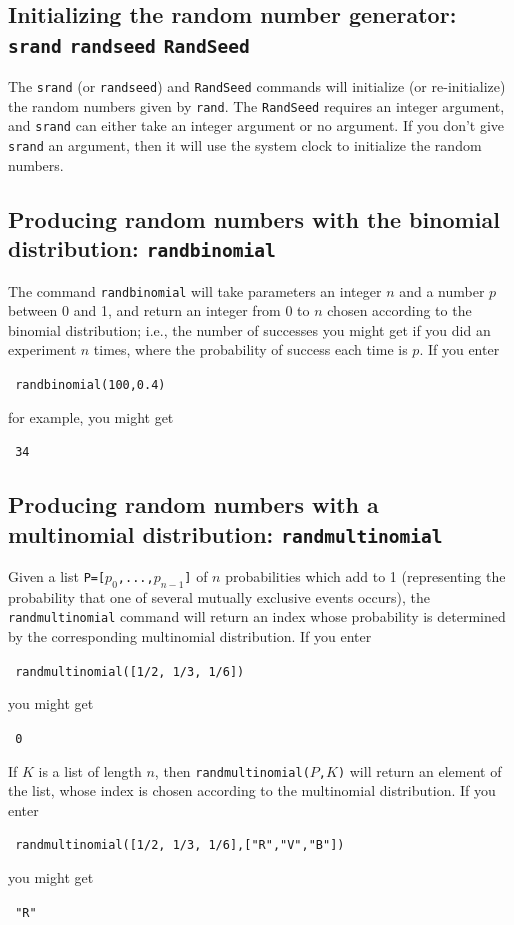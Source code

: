 \documentclass[a4paper,11pt]{book}
\begin{document}
\subsection{Initializing the random number generator: \texttt{srand} \texttt{randseed} \texttt{RandSeed}}

The \texttt{srand} (or \texttt{randseed}) and \texttt{RandSeed}
commands will initialize (or re-initialize) the random numbers given
by \texttt{rand}.  The \texttt{RandSeed} requires an integer argument,
and \texttt{srand} can either take an integer argument or no argument.
If you don't give \texttt{srand} an argument, then it will use the
system clock to initialize the random numbers.  

\subsection{Producing random numbers with the binomial distribution: \texttt{randbinomial}}

The command \texttt{randbinomial} will take parameters an integer $n$
and a number $p$ between 0 and 1, and return an integer from 0 to $n$
chosen according to the binomial distribution; i.e., the number of
successes you might get if you did an experiment $n$ times, where the
probability of success each time is $p$.  If you enter
\begin{center}
  \tt
  randbinomial(100,0.4)
\end{center}
for example, you might get
\begin{center}
  \tt
  34
\end{center}

\subsection{Producing random numbers with a multinomial distribution: \texttt{randmultinomial}}

Given a list \texttt{P=[$p_0$,...,$p_{n-1}$]} of $n$ probabilities which
add to 1 (representing the probability that one of several mutually
exclusive events occurs), the \texttt{randmultinomial} command will
return an index whose probability is determined by the corresponding
multinomial distribution.  If you enter
\begin{center}
  \tt
  randmultinomial([1/2, 1/3, 1/6])
\end{center}
you might get
\begin{center}
  \tt
  0
\end{center}
If $K$ is a list of length $n$, then \texttt{randmultinomial($P$,$K$)}
will return an element of the list, whose index is chosen according to
the multinomial distribution.  If you enter
\begin{center}
  \tt
  randmultinomial([1/2, 1/3, 1/6],["R","V","B"])
\end{center}
you might get
\begin{center}
  \tt
  "R"
\end{center}
\end{document}
